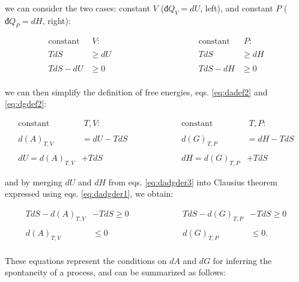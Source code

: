 \documentclass[
]{book}
\theoremstyle{definition}
\theoremstyle{definition}
\theoremstyle{definition}
\theoremstyle{remark}
\begin{document}
we can consider the two cases: constant \(V\) (\(đQ_V=dU\), left), and constant \(P\) (\(đQ_P=dH\), right):

\begin{equation}
\begin{aligned}
\text{constant} & \; V:           & \qquad \qquad & \qquad \qquad &     \text{constant} & \; P: \\
\\
TdS & \geq dU           & &   &     TdS & \geq dH \\
\\
TdS -dU & \geq 0         & &   &      TdS -dH & \geq 0 \\
\end{aligned}
\label{eq:dadgder1}
\end{equation}

we can then simplify the definition of free energies, eqs. \eqref{eq:dadef2} and \eqref{eq:dgdef2}:

\begin{equation}
\begin{aligned}
\text{constant} & \; T,V:           & \qquad & \qquad &     \text{constant} & \; T,P: \\
\\
d(A)_{T,V} &= dU -TdS     & &   &       d(G)_{T,P} &= dH - TdS \\ 
\\
dU = d(A)_{T,V} &+TdS       & &   &       dH = d(G)_{T,P} &+TdS
\end{aligned}
\label{eq:dadgder3}
\end{equation}

and by merging \(dU\) and \(dH\) from eqs. \eqref{eq:dadgder3} into Clausius theorem expressed using eqs. \eqref{eq:dadgder1}, we obtain:

\begin{equation}
\begin{aligned}
TdS -d(A)_{T,V} &- TdS \geq 0 & \qquad & \qquad & TdS -d(G)_{T,P} &- TdS \geq 0 \\
\\
d(A)_{T,V} & \leq 0 & \qquad & \qquad & d(G)_{T,P} & \leq 0. \\
\end{aligned}
\label{eq:dadgcond}
\end{equation}

These equations represent the conditions on \(dA\) and \(dG\) for inferring the spontaneity of a process, and can be summarized as follows:
\end{document}

